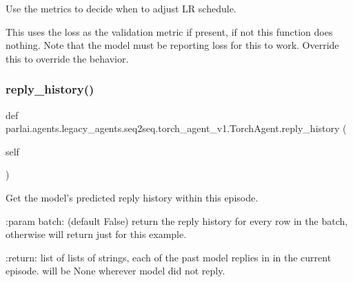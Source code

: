 \begin{DoxyVerb}Use the metrics to decide when to adjust LR schedule.

This uses the loss as the validation metric if present, if not this function
does nothing. Note that the model must be reporting loss for this to work.
Override this to override the behavior.
\end{DoxyVerb}
 \mbox{\label{classparlai_1_1agents_1_1legacy__agents_1_1seq2seq_1_1torch__agent__v1_1_1TorchAgent_ae4b2346c35e214a8028eb83d1fc5ffd7}} 
\subsubsection{\texorpdfstring{reply\+\_\+history()}{reply\_history()}}
{\footnotesize\ttfamily def parlai.\+agents.\+legacy\+\_\+agents.\+seq2seq.\+torch\+\_\+agent\+\_\+v1.\+Torch\+Agent.\+reply\+\_\+history (\begin{DoxyParamCaption}\item[{}]{self }\end{DoxyParamCaption})}

\begin{DoxyVerb}Get the model's predicted reply history within this episode.

:param batch: (default False) return the reply history for every
      row in the batch, otherwise will return just for this
      example.

:return: list of lists of strings, each of the past model replies in
 in the current episode. will be None wherever model did not
 reply.
\end{DoxyVerb}
 \mbox{\label{classparlai_1_1agents_1_1legacy__agents_1_1seq2seq_1_1torch__agent__v1_1_1TorchAgent_a93e935c0d2d589d8990ff14d6e528c4d}} 
